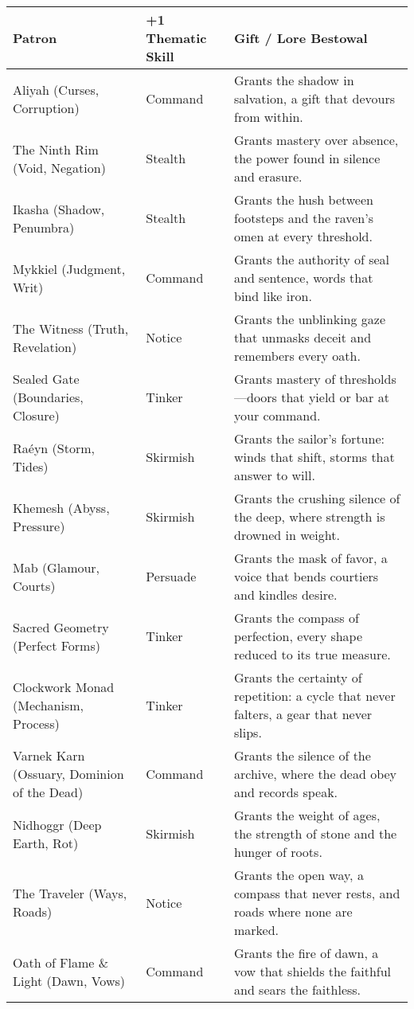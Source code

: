 \begin{table}[H]
  \centering
  \renewcommand{\arraystretch}{1.15}
  \begin{tabular}{@{}p{3.8cm}p{3.8cm}p{7.5cm}@{}}
  \toprule
  \textbf{Patron} & \textbf{+1 Thematic Skill} & \textbf{Gift / Lore Bestowal} \\
  \midrule
  Aliyah (Curses, Corruption) & Command & Grants the shadow in salvation, a gift that devours from within. \\
  The Ninth Rim (Void, Negation) & Stealth & Grants mastery over absence, the power found in silence and erasure. \\
  Ikasha (Shadow, Penumbra) & Stealth & Grants the hush between footsteps and the raven's omen at every threshold. \\
  Mykkiel (Judgment, Writ) & Command & Grants the authority of seal and sentence, words that bind like iron. \\
  The Witness (Truth, Revelation) & Notice & Grants the unblinking gaze that unmasks deceit and remembers every oath. \\
  Sealed Gate (Boundaries, Closure) & Tinker & Grants mastery of thresholds—doors that yield or bar at your command. \\
  Raéyn (Storm, Tides) & Skirmish & Grants the sailor's fortune: winds that shift, storms that answer to will. \\
  Khemesh (Abyss, Pressure) & Skirmish & Grants the crushing silence of the deep, where strength is drowned in weight. \\
  Mab (Glamour, Courts) & Persuade & Grants the mask of favor, a voice that bends courtiers and kindles desire. \\
  Sacred Geometry (Perfect Forms) & Tinker & Grants the compass of perfection, every shape reduced to its true measure. \\
  Clockwork Monad (Mechanism, Process) & Tinker & Grants the certainty of repetition: a cycle that never falters, a gear that never slips. \\
  Varnek Karn (Ossuary, Dominion of the Dead) & Command & Grants the silence of the archive, where the dead obey and records speak. \\
  Nidhoggr (Deep Earth, Rot) & Skirmish & Grants the weight of ages, the strength of stone and the hunger of roots. \\
  The Traveler (Ways, Roads) & Notice & Grants the open way, a compass that never rests, and roads where none are marked. \\
  Oath of Flame \& Light (Dawn, Vows) & Command & Grants the fire of dawn, a vow that shields the faithful and sears the faithless. \\

\end{tabular}
\end{table}
